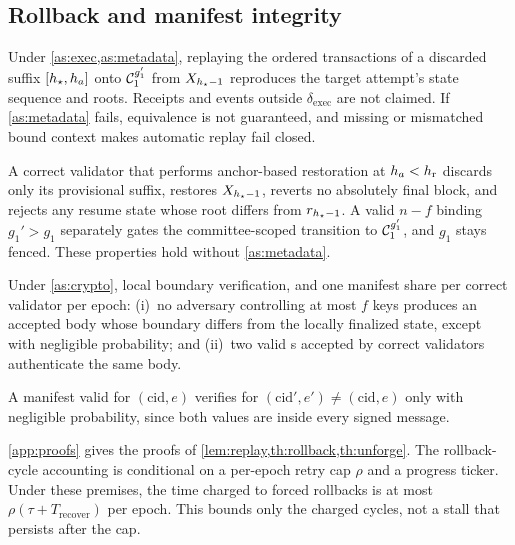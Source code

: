 \subsection{Rollback and manifest integrity}
\begin{lemma}
\label{lem:replay}
Under \cref{as:exec,as:metadata}, replaying the ordered transactions of a discarded suffix
$[h_{\star},h_a]$ onto $\mathcal{C}_1^{g_1'}$ from $X_{h_{\star}-1}$ reproduces the target attempt's state sequence and
roots. Receipts and events outside $\delta_{\mathrm{exec}}$ are not claimed. If \cref{as:metadata}
fails, equivalence is not guaranteed, and missing or mismatched bound context makes automatic replay
fail closed.
\end{lemma}

\begin{theorem}
\label{th:rollback}
A correct validator that performs anchor-based restoration at $h_a<h_{\mathrm r}$ discards only its provisional
suffix, restores $X_{h_{\star}-1}$, reverts no absolutely final block, and rejects any resume state whose
root differs from $r_{h_{\star}-1}$. A valid $n-f$ \AbortCert{} binding $g_1'>g_1$ separately gates the
committee-scoped transition to $\mathcal{C}_1^{g_1'}$, and $g_1$ stays fenced. These properties hold without
\cref{as:metadata}.
\end{theorem}

\begin{theorem}
\label{th:unforge}
Under \cref{as:crypto}, local boundary verification, and one manifest share per correct validator per
epoch: (i)~no adversary controlling at most $f$ keys produces an accepted body whose boundary differs
from the locally finalized state, except with negligible probability; and (ii)~two valid \ManCert{}s
accepted by correct validators authenticate the same body.
\end{theorem}

\begin{proposition}
\label{prop:replay}
A manifest valid for $(\mathrm{cid},e)$ verifies for $(\mathrm{cid}',e')\neq(\mathrm{cid},e)$ only with
negligible probability, since both values are inside every signed message.
\end{proposition}

\ref{app:proofs} gives the proofs of \cref{lem:replay,th:rollback,th:unforge}. The
rollback-cycle accounting is conditional on a per-epoch retry cap $\rho$ and a progress ticker. Under
these premises, the time charged to forced rollbacks is at most $\rho(\tau+T_{\mathrm{recover}})$ per
epoch. This bounds only the charged cycles, not a stall that persists after the cap.

